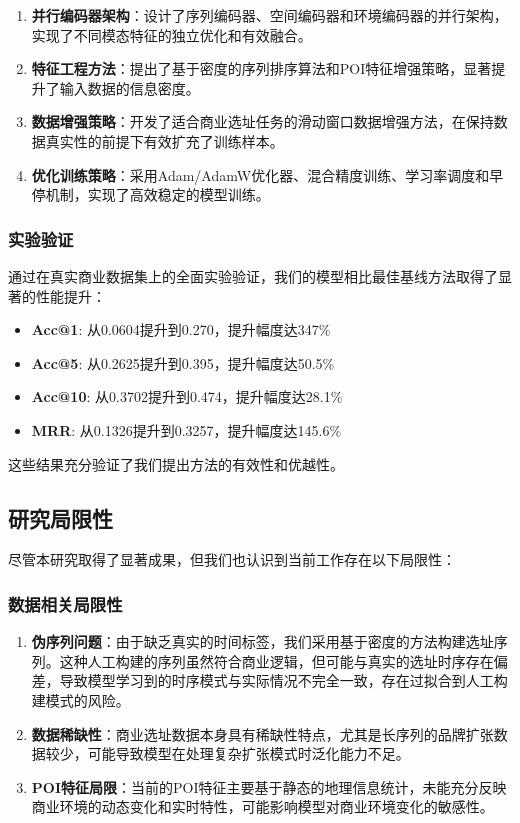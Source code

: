\documentclass{article}
\begin{document}
\begin{enumerate}
\item \textbf{并行编码器架构}：设计了序列编码器、空间编码器和环境编码器的并行架构，实现了不同模态特征的独立优化和有效融合。
\item \textbf{特征工程方法}：提出了基于密度的序列排序算法和POI特征增强策略，显著提升了输入数据的信息密度。
\item \textbf{数据增强策略}：开发了适合商业选址任务的滑动窗口数据增强方法，在保持数据真实性的前提下有效扩充了训练样本。
\item \textbf{优化训练策略}：采用Adam/AdamW优化器、混合精度训练、学习率调度和早停机制，实现了高效稳定的模型训练。
\end{enumerate}

\subsubsection{实验验证}

通过在真实商业数据集上的全面实验验证，我们的模型相比最佳基线方法取得了显著的性能提升：

\begin{itemize}
\item \textbf{Acc@1}: 从0.0604提升到0.270，提升幅度达347\%
\item \textbf{Acc@5}: 从0.2625提升到0.395，提升幅度达50.5\%
\item \textbf{Acc@10}: 从0.3702提升到0.474，提升幅度达28.1\%
\item \textbf{MRR}: 从0.1326提升到0.3257，提升幅度达145.6\%
\end{itemize}

这些结果充分验证了我们提出方法的有效性和优越性。

\subsection{研究局限性}

尽管本研究取得了显著成果，但我们也认识到当前工作存在以下局限性：

\subsubsection{数据相关局限性}

\begin{enumerate}
\item \textbf{伪序列问题}：由于缺乏真实的时间标签，我们采用基于密度的方法构建选址序列。这种人工构建的序列虽然符合商业逻辑，但可能与真实的选址时序存在偏差，导致模型学习到的时序模式与实际情况不完全一致，存在过拟合到人工构建模式的风险。

\item \textbf{数据稀缺性}：商业选址数据本身具有稀缺性特点，尤其是长序列的品牌扩张数据较少，可能导致模型在处理复杂扩张模式时泛化能力不足。

\item \textbf{POI特征局限}：当前的POI特征主要基于静态的地理信息统计，未能充分反映商业环境的动态变化和实时特性，可能影响模型对商业环境变化的敏感性。
\end{enumerate}
\end{document}
